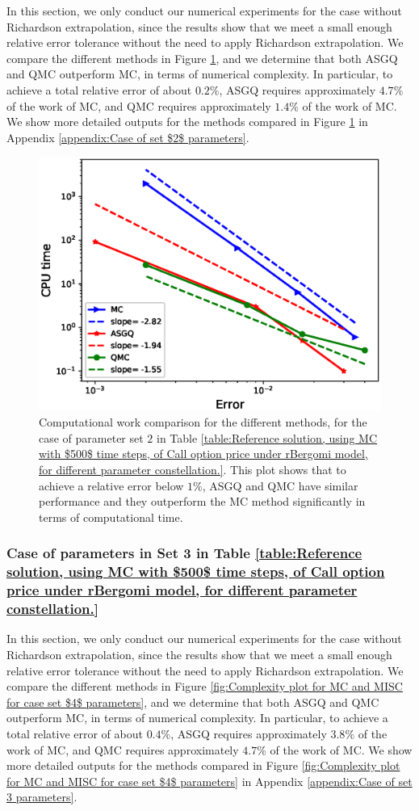 In this section, we only conduct our numerical experiments for the case without Richardson extrapolation, since the results show that we meet a small enough relative error tolerance without the need to apply Richardson extrapolation. We compare the different methods  in Figure \ref{fig:Complexity plot for  MISC for case set $3$ parameters, comparison}, and we determine that both ASGQ and QMC outperform MC, in terms of numerical complexity. In particular,  to achieve a total relative error of about $0.2\%$, ASGQ  requires
	approximately $4.7\%$ of the work of MC, and  QMC requires approximately $1.4\%$ of the work of MC. We show more detailed outputs for the methods compared in Figure \ref{fig:Complexity plot for  MISC for case set $3$ parameters, comparison} in Appendix \ref{appendix:Case of set $2$ parameters}. 
\FloatBarrier
	\begin{figure}[h!]
	\centering
	\includegraphics[width=0.4\linewidth]{./figures/rBergomi_Complexity_rates/set5/error_vs_time_set5_full_comparison}
	
	\caption{Computational work comparison for   the different  methods, for the case of parameter set $2$ in Table \ref{table:Reference solution, using MC with $500$ time steps, of Call option price under rBergomi model, for different parameter constellation.}. This plot shows that to achieve a relative error below $1\%$, ASGQ and QMC have similar performance and they outperform  the MC method significantly in terms of computational time.}
	\label{fig:Complexity plot for  MISC for case set $3$ parameters, comparison}
\end{figure}
\FloatBarrier
\subsubsection{Case of parameters in Set 3  in Table \ref{table:Reference solution, using MC with $500$ time steps, of Call option price under rBergomi model, for different parameter constellation.} }\label{sec:Case of set 4 parameters}
In this section, we only conduct our numerical experiments for the case without Richardson extrapolation, since the results show that we meet a small enough relative error tolerance without the need to apply Richardson extrapolation. We compare the different methods  in Figure \ref{fig:Complexity plot for MC and MISC for case set $4$ parameters}, and we determine that both ASGQ and QMC outperform MC, in terms of numerical complexity. In particular,  to achieve a total relative error of about $0.4\%$, ASGQ  requires
	approximately $3.8\%$ of the work of MC, and  QMC requires approximately $4.7\%$ of the work of MC. We show more detailed outputs for the methods compared in Figure \ref{fig:Complexity plot for MC and MISC for case set $4$ parameters} in Appendix \ref{appendix:Case of set 3 parameters}.


